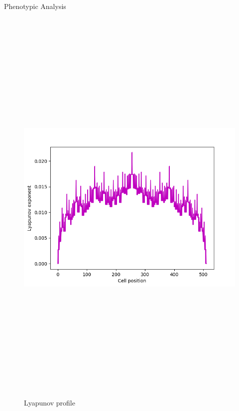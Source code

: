 \documentclass[12pt, letterpaper]{article}
\begin{document}
\begin{section}{Phenotypic Analysis}
\begin{figure}[H]
			\includegraphics[max width=200mm, max height=200mm, keepaspectratio]{SimLyapunovExp.png} 
		\caption{Lyapunov profile} 
		\end{figure} 
    \end{section} 
    \clearpage 
\end{document}

